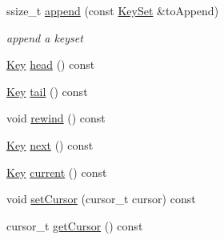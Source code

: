 \begin{DoxyCompactItemize}
ssize\-\_\-t \hyperlink{classkdb_1_1KeySet_ac9cbdc933d7171037d47c6d4d78595d1}{append} (const \hyperlink{classkdb_1_1KeySet}{Key\-Set} \&to\-Append)
\begin{DoxyCompactList}\small\item\em append a keyset \end{DoxyCompactList}\item 
\hyperlink{classkdb_1_1Key}{Key} \hyperlink{classkdb_1_1KeySet_ad2b65a3aedad1e495351c770b29cd5c4}{head} () const 
\begin{DoxyCompactList}\small\item\em \end{DoxyCompactList}\item 
\hyperlink{classkdb_1_1Key}{Key} \hyperlink{classkdb_1_1KeySet_ac6ccd44a29326a0d9a5c2e60d3089b5e}{tail} () const 
\begin{DoxyCompactList}\small\item\em \end{DoxyCompactList}\item 
void \hyperlink{classkdb_1_1KeySet_a4476a586a48a64160c71ed480c681b19}{rewind} () const 
\begin{DoxyCompactList}\small\item\em \end{DoxyCompactList}\item 
\hyperlink{classkdb_1_1Key}{Key} \hyperlink{classkdb_1_1KeySet_a03f115c65cf2720411bb76d5f4e10c25}{next} () const 
\begin{DoxyCompactList}\small\item\em \end{DoxyCompactList}\item 
\hyperlink{classkdb_1_1Key}{Key} \hyperlink{classkdb_1_1KeySet_a2c9c26dbbf5ec0ed82093e1793a79fe1}{current} () const 
\begin{DoxyCompactList}\small\item\em \end{DoxyCompactList}\item 
void \hyperlink{classkdb_1_1KeySet_a844be268914882e5159424e9ee302119}{set\-Cursor} (cursor\-\_\-t cursor) const 
\begin{DoxyCompactList}\small\item\em \end{DoxyCompactList}\item 
cursor\-\_\-t \hyperlink{classkdb_1_1KeySet_ab3b63a96df7100e58cbb812e3d4223f2}{get\-Cursor} () const 
\begin{DoxyCompactList}\small\item\em \end{DoxyCompactList}\item 

\end{DoxyCompactItemize}

